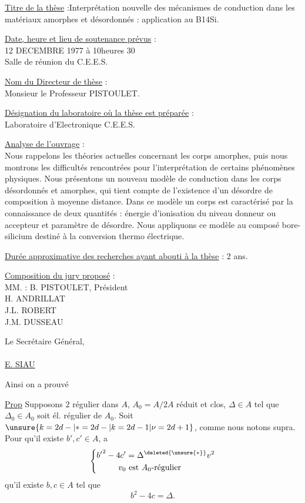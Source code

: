 \uline{Titre de la thèse} :\textquotedbl{}Interprétation nouvelle des mécanismes de conduction dans les matériaux amorphes et désordonnés : application au B14Si\textquotedbl{}.

\uline{Date, heure et lieu de soutenance prévus} :\\
12 DECEMBRE 1977 à 10heures 30\\
Salle de réunion du C.E.E.S.

\uline{Nom du Directeur de thèse} :\\
Monsieur le Professeur PISTOULET.

\uline{Désignation du laboratoire où la thèse est préparée} :\\
Laboratoire d'Electronique C.E.E.S.

\uline{Analyse de l'ouvrage} :\\
Nous rappelons les théories actuelles concernant les corps amorphes, puis nous montrons les difficultés rencontrées pour l'interprétation de certains phénomènes physiques. Nous présentons un nouveau modèle de conduction dans les corps désordonnés et amorphes, qui tient compte de l'existence d'un désordre de composition à moyenne distance. Dans ce modèle un corps est caractérisé par la connaissance de deux quantités : énergie d'ionisation du niveau donneur ou accepteur et paramètre de désordre. Nous appliquons ce modèle au composé bore-silicium destiné à la conversion thermo électrique.

\uline{Durée approximative des recherches ayant abouti à la thèse} : 2 ans.

\uline{Composition du jury proposé} :\\
MM. : B. PISTOULET, Président\\
H. ANDRILLAT\\
J.L. ROBERT\\
J.M. DUSSEAU

Le Secrétaire Général,\\
\\
\uline{E. SIAU}

Ainsi on a prouvé

\uline{Prop} Supposons $2$ régulier dans $A$, $A_0=A/2A$ réduit et  clos, $\Delta\in A$ tel que $\Delta_0\in A_0$ soit él. régulier de $A_0$. Soit $\unsure{k=2d-|*=2d-|k=2d-1|\nu=2d+1}$, comme nous notons supra. Pour qu'il existe $b',c'\in A$,   a
\[
\left\{\begin{aligned}
{b'}^2-4c'&=\Delta^{\deleted{\unsure{*}}}v^2\\
v_0&\text{ est $A_0$-régulier}
\end{aligned}\right.
\]
 qu'il existe $b,c\in A$ tel que
\[
 b^2-4c=\Delta.
\]

